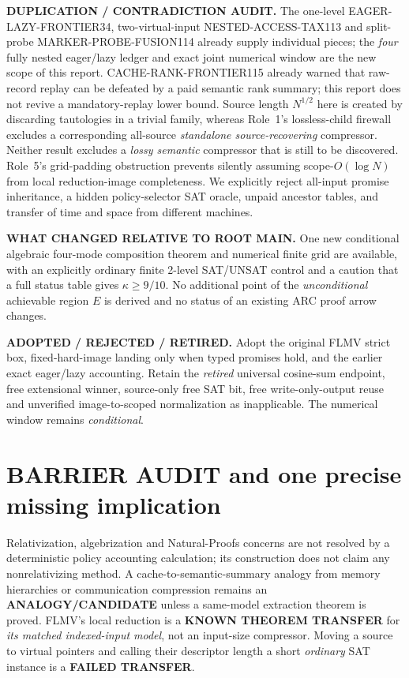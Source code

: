 \documentclass[11pt]{article}
\newcommand{\EE}{\mathsf{EE}}
\begin{document}
\noindent\textbf{DUPLICATION / CONTRADICTION AUDIT.}
The one-level EAGER-LAZY-FRONTIER34,
two-virtual-input NESTED-ACCESS-TAX113 and
split-probe MARKER-PROBE-FUSION114 already
supply individual pieces; the \emph{four}
fully nested eager/lazy ledger and exact
joint numerical window are the new
scope of this report. CACHE-RANK-FRONTIER115
already warned that raw-record replay can
be defeated by a paid semantic rank summary;
this report does not revive a
mandatory-replay lower bound. Source
length $N^{1/2}$ here is created by
discarding tautologies in a trivial family,
whereas Role~1's lossless-child firewall
excludes a corresponding all-source
\emph{standalone source-recovering}
compressor. Neither result excludes a
\emph{lossy semantic} compressor that
is still to be discovered.
Role~5's grid-padding obstruction
prevents silently assuming
scope-$O(\log N)$ from local reduction-image
completeness. We explicitly reject
all-input promise inheritance, a
hidden policy-selector SAT oracle,
unpaid ancestor tables, and transfer
of time and space from different machines.

\noindent\textbf{WHAT CHANGED RELATIVE TO ROOT MAIN.}
One new conditional algebraic four-mode
composition theorem and numerical
finite grid are available, with
an explicitly ordinary finite 2-level
SAT/UNSAT control and a caution that
a full status table gives
$\kappa\ge9/10$. No additional point
of the \emph{unconditional} achievable
region $E$ is derived and no
status of an existing ARC proof arrow changes.

\noindent\textbf{ADOPTED / REJECTED / RETIRED.}
Adopt the original FLMV strict box,
fixed-hard-image landing only when
typed promises hold, and the earlier
exact eager/lazy accounting.
Retain the \emph{retired} universal
cosine-sum endpoint, free extensional
winner, source-only free SAT bit,
free write-only-output reuse and
unverified image-to-scoped normalization
as inapplicable. The numerical
\EE{} window remains \emph{conditional}.

\section*{BARRIER AUDIT and one precise missing implication}
Relativization, algebrization and
Natural-Proofs concerns are not resolved
by a deterministic policy accounting
calculation; its construction does not
claim any nonrelativizing method.
A cache-to-semantic-summary
analogy from memory hierarchies or
communication compression remains
an \textbf{ANALOGY/CANDIDATE} unless
a same-model extraction theorem is
proved. FLMV's local reduction is
a \textbf{KNOWN THEOREM TRANSFER}
for \emph{its matched indexed-input model},
not an input-size compressor.
Moving a source to virtual pointers and
calling their descriptor length a short
\emph{ordinary} SAT instance is a
\textbf{FAILED TRANSFER}.
\end{document}
